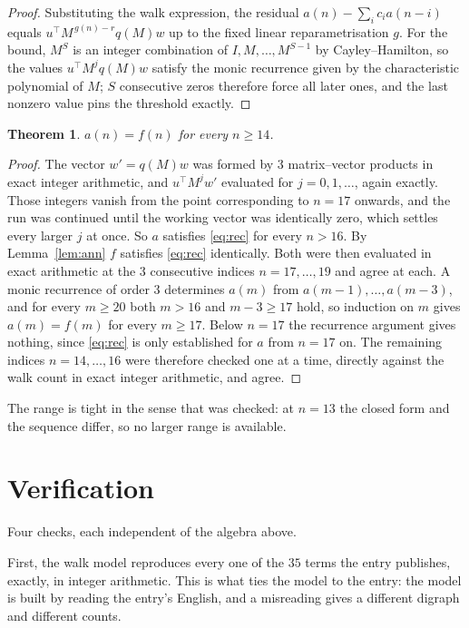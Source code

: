 \documentclass[11pt,a4paper]{article}
\theoremstyle{plain}
\newtheorem{theorem}{Theorem}
\theoremstyle{definition}
\begin{document}
\begin{proof}
Substituting the walk expression, the residual $a(n)-\sum_ic_ia(n-i)$ equals
$u^{\!\top}M^{\,g(n)-r}q(M)w$ up to the fixed linear reparametrisation $g$. For the bound,
$M^{S}$ is an integer combination of $I,M,\dots,M^{S-1}$ by Cayley--Hamilton, so the values
$u^{\!\top}M^{j}q(M)w$ satisfy the monic recurrence given by the characteristic polynomial of
$M$; $S$ consecutive zeros therefore force all later ones, and the last nonzero value pins the
threshold exactly.
\end{proof}

\begin{theorem}
$a(n)=f(n)$ for every $n\ge14$.
\end{theorem}

\begin{proof}
The vector $w'=q(M)w$ was formed by $3$ matrix--vector products in exact integer
arithmetic, and $u^{\!\top}M^{j}w'$ evaluated for $j=0,1,\dots$, again exactly. Those integers
vanish from the point corresponding to $n=17$ onwards, and the run was continued until the
working vector was identically zero, which settles every larger $j$ at once. So $a$ satisfies
\eqref{eq:rec} for every $n>16$. By Lemma~\ref{lem:ann} $f$ satisfies \eqref{eq:rec}
identically. Both were then evaluated in exact arithmetic at the $3$ consecutive indices
$n=17,\dots,19$ and agree at each. A monic recurrence of order $3$
determines $a(m)$ from $a(m-1),\dots,a(m-3)$, and for every $m\ge20$ both
$m>16$ and $m-3\ge17$ hold, so induction on $m$ gives $a(m)=f(m)$ for every
$m\ge17$.
Below $n=17$ the recurrence argument gives nothing, since \eqref{eq:rec} is only
established for $a$ from $n=17$ on. The remaining indices $n=14,\dots,16$ were
therefore checked one at a time, directly against the walk count in exact integer arithmetic,
and agree.
\end{proof}

The range is tight in the sense that was checked: at $n=13$ the closed form and the sequence differ, so no larger range is available.

\section{Verification}

Four checks, each independent of the algebra above.

First, the walk model reproduces every one of the $35$ terms the entry publishes,
exactly, in integer arithmetic. This is what ties the model to the entry: the model is built
by reading the entry's English, and a misreading gives a different digraph and different
counts.
\end{document}
